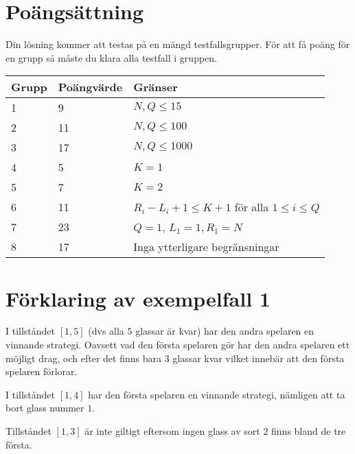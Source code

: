 \section*{Poängsättning}
Din lösning kommer att testas på en mängd testfallsgrupper.
För att få poäng för en grupp så måste du klara alla testfall i gruppen.

\noindent
\begin{tabular}{| l | l | l |}
\hline
Grupp & Poängvärde & Gränser \\ \hline
1     & 9          &  $N,Q \le 15$\\ \hline
2     & 11         &  $N,Q \le 100$ \\ \hline
3     & 17         &  $N,Q \le 1000$ \\ \hline
4     & 5          &  $K=1$ \\ \hline
5     & 7          &  $K=2$ \\ \hline
6     & 11         &  $R_i - L_i + 1 \le K+1$ för alla $1 \le i \le Q$ \\ \hline
7     & 23         &  $Q=1$, $L_1=1, R_1=N$ \\ \hline
8     & 17         &  Inga ytterligare begränsningar \\ \hline
\end{tabular}

\section*{Förklaring av exempelfall 1}
I tillståndet $[1,5]$ (dvs alla $5$ glassar är kvar) har den andra spelaren en vinnande strategi. 
Oavsett vad den första spelaren gör har den andra spelaren ett möjligt drag, och efter det finns bara $3$ glassar kvar
vilket innebär att den första spelaren förlorar.

I tillståndet $[1,4]$ har den första spelaren en vinnande strategi, nämligen att ta bort glass nummer $1$.

Tillståndet $[1,3]$ är inte giltigt eftersom ingen glass av sort $2$ finns bland de tre första.

